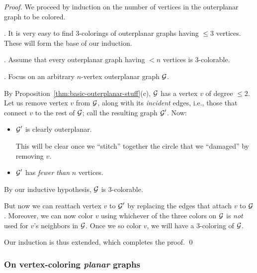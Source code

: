 \begin{proof}
We proceed by induction on the number of vertices in the outerplanar graph to be colored.

\smallskip

.
It is very easy to find $3$-colorings of outerplanar graphs having $\leq 3$ vertices.  These will form the base of our induction.

\medskip

.
Assume that every outerplanar graph having $< n$ vertices is $3$-colorable.

\medskip

.
Focus on an arbitrary $n$-vertex outerplanar graph $\mbox{$\cal G$}$.

\smallskip


By Proposition~\ref{thm:basic-outerplanar-stuff}(c), $\mbox{$\cal G$}$ has a vertex $v$ of degree $\leq 2$.  Let us remove vertex $v$ from $\mbox{$\cal G$}$, along with its {\it incident} edges, i.e., those that connect $v$ to the rest of $\mbox{$\cal G$}$; call the resulting graph $\mbox{$\cal G$}'$.  Now: 
\begin{itemize}
\item
$\mbox{$\cal G$}'$ is clearly outerplanar.

\smallskip

This will be clear once we ``stitch'' together the circle that we ``damaged'' by removing $v$.
\medskip\item
$\mbox{$\cal G$}'$ has {\em fewer than} $n$ vertices.
\end{itemize}
By our inductive hypothesis, $\mbox{$\cal G$}$ is $3$-colorable.

\smallskip

But now we can reattach vertex $v$ to $\mbox{$\cal G$}'$ by replacing the edges that attach $v$ to $\mbox{$\cal G$}$. Moreover, we can now color $v$ using whichever of the three colors on $\mbox{$\cal G$}$ is {\em not} used for $v$'s neighbors in $\mbox{$\cal G$}$.  Once we so color $v$, we will have a $3$-coloring of $\mbox{$\cal G$}$.

\smallskip

Our induction is thus extended, which completes the proof.  \qed
\end{proof}


\subsubsection{On vertex-coloring {\em planar} graphs}
\label{sec:planar-graphs}

